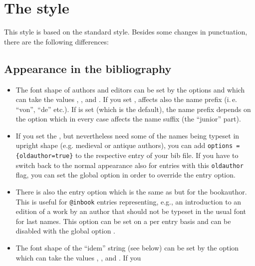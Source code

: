 \documentclass[english]{scrartcl}
\begin{document}
\section{The  style}
This style is based on the standard  style.
Besides some changes in punctuation, there are the following differences:

\subsection{Appearance in the bibliography}
\begin{itemize}
	\item The font shape of authors and editors can be set by the options 
	       and  which can take the values 
	      , ,  and . 
	      If you set ,  affects also 
	      the name prefix (i.\,e. \enquote{von}, \enquote{de} etc.). If  is set (which is the default), the name prefix depends
	      on the option  which in every case affects the
	      name suffix (the \enquote{junior} part).
	\item If you set the , but nevertheless need some
	      of the names being typeset in upright shape (e.g. medieval or
	      antique authors), you can add \texttt{options\,=\,\{oldauthor=true\}} 
	      to the respective entry of your
	      bib file. If you have to switch back to the normal appearance also
	      for entries with this \texttt{oldauthor} flag, you can set the global
	      option  in order to override the entry option.
  \item There is also the entry option 
        which is the same as  but for the bookauthor. This is 
        useful for \texttt{@inbook} entries representing, e.g., an introduction to an 
        edition of a work by an author that should not be typeset in the usual font 
        for last names. This option can be set on a per entry basis and can be 
        disabled with the global option .
	\item The font shape of the \enquote{idem} string (see below) can be set by
	      the option  which can take the values 
	      , ,  and . If you

\end{itemize}
\end{document}
